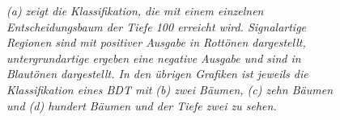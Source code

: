 \begin{figure}[hhh]
\centering     %
{}
\caption{\it (a) zeigt die Klassifikation, die mit einem einzelnen Entscheidungsbaum der Tiefe 100 erreicht wird. Signalartige Regionen sind mit positiver Ausgabe in Rott\"onen dargestellt, untergrundartige ergeben eine negative Ausgabe und sind in Blaut\"onen dargestellt. In den \"ubrigen Grafiken ist jeweils die Klassifikation eines BDT mit (b) zwei B\"aumen, (c) zehn B\"aumen und (d) hundert B\"aumen und der Tiefe zwei zu sehen.}
\label{fig:boosting}
\end{figure}

